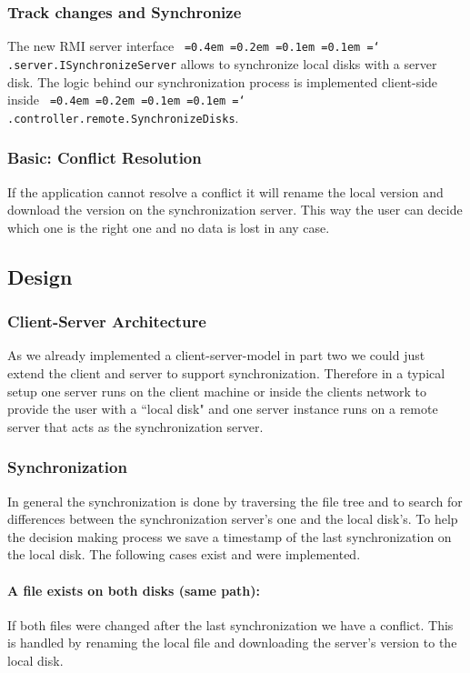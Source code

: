 \documentclass[a4paper,12pt]{article}
\newcommand*\justify{%
  \fontdimen2\font=0.4em%
  \fontdimen3\font=0.2em%
  \fontdimen4\font=0.1em%
  \fontdimen7\font=0.1em%
  \hyphenchar\font=`\-%
}
\newcommand{\mono}[1]{\texttt{\justify #1}}
\begin{document}
\subsubsection{Track changes and Synchronize}
The new RMI server interface \mono{.server.ISynchronizeServer} allows to synchronize local disks with a server disk. The logic behind our synchronization process is implemented client-side inside \mono{.controller.remote.SynchronizeDisks}.

\subsubsection{Basic: Conflict Resolution}
If the application cannot resolve a conflict it will rename the local version and download the version on the synchronization server. This way the user can decide which one is the right one and no data is lost in any case.

\subsection{Design}

\subsubsection{Client-Server Architecture}
As we already implemented a client-server-model in part two we could just extend the client and server to support synchronization. Therefore in a typical setup one server runs on the client machine or inside the clients network to provide the user with a ``local disk" and one server instance runs on a remote server that acts as the synchronization server.

\subsubsection{Synchronization}
In general the synchronization is done by traversing the file tree and to search for differences between the synchronization server's one and the local disk's. To help the decision making process we save a timestamp of the last synchronization on the local disk. The following cases exist and were implemented.

\paragraph{A file exists on both disks (same path):} If both files were changed after the last synchronization we have a conflict. This is handled by renaming the local file and downloading the server's version to the local disk.
\end{document}
